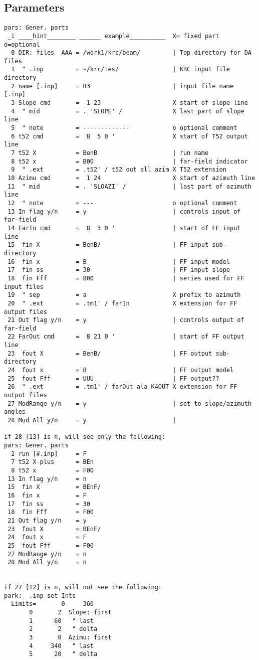 \documentclass{article}
\begin{document}
\subsection{Parameters} %
\vspace{-3.mm} 
\begin{verbatim}
pars: Gener. parts                   
 _i ____hint________ ______ example__________  X= fixed part  o=optional
  0 DIR: files  AAA = /work1/krc/beam/         | Top directory for DA files
  1  " .inp         = ~/krc/tes/               | KRC input file directory
  2 name [.inp]     = B3                       | input file name [.inp]
  3 Slope cmd       =  1 23                    X start of slope line
  4  " mid          = . 'SLOPE' /              X last part of slope line
  5  " note         = -------------            o optional comment
  6 t52 cmd         =  8  5 0 '                X start of T52 output line
  7 t52 X           = BenB                     | run name
  8 t52 x           = B00                      | far-field indicator
  9  " .ext         = .t52' / t52 out all azim X T52 extension
 10 Azimu cmd       =  1 24                    X start of azimuth line
 11  " mid          = . 'SLOAZI' /             | last part of azimuth line
 12  " note         = ---                      o optional comment
 13 In flag y/n     = y                        | controls input of far-field
 14 FarIn cmd       =  8  3 0 '                | start of FF input line
 15  fin X          = BenB/                    | FF input sub-directory
 16  fin x          = B                        | FF input model
 17  fin ss         = 30                       | FF input slope
 18  fin Fff        = B00                      | series used for FF input files
 19  " sep          = a                        X prefix to azimuth
 20  " .ext         = .tm1' / farIn            X extension for FF output files
 21 Out flag y/n    = y                        | controls output of far-field
 22 FarOut cmd      =  8 21 0 '                | start of FF output line
 23  fout X         = BenB/                    | FF output sub-directory
 24  fout x         = B                        | FF output model
 25  fout Fff       = UUU                      | FF output??
 26  " .ext         = .tm1' / farOut ala K4OUT X extension for FF output files
 27 ModRange y/n    = y                        | set to slope/azimuth angles
 28 Mod All y/n     = y                        | 

if 28 [13] is n, will see only the following:
pars: Gener. parts
  2 run [#.inp]     = F
  7 t52 X-plus      = BEn
  8 t52 x           = F00
 13 In flag y/n     = n
 15  fin X          = BEnF/
 16  fin x          = F
 17  fin ss         = 30
 18  fin Fff        = F00
 21 Out flag y/n    = y
 23  fout X         = BEnF/
 24  fout x         = F
 25  fout Fff       = F00
 27 ModRange y/n    = n
 28 Mod All y/n     = n


if 27 [12] is n, will not see the following:
park:  .inp set Ints
  Limits=       0     360
       0       2  Slope: first
       1      60   " last
       2       2   " delta
       3       0  Azimu: first
       4     340   " last
       5      20   " delta
\end{verbatim}
\end{document}
